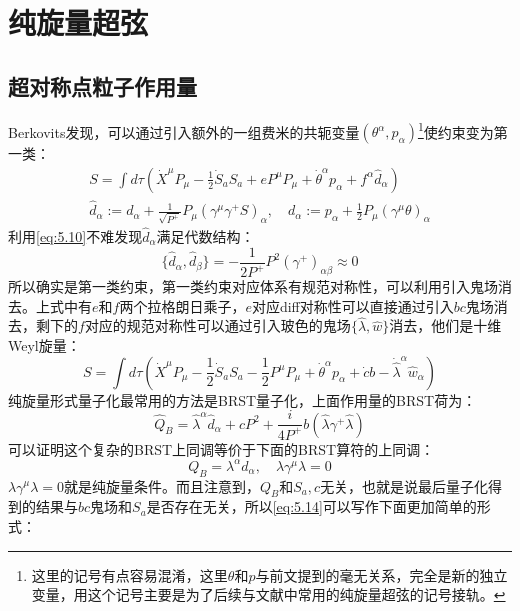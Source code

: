 \section{纯旋量超弦}
\subsection{超对称点粒子作用量}
Berkovits发现，可以通过引入额外的一组费米的共轭变量$(\theta^\alpha,p_\alpha)$\footnote{这里的记号有点容易混淆，这里$\theta$和$p$与前文提到的毫无关系，完全是新的独立变量，用这个记号主要是为了后续与文献中常用的纯旋量超弦的记号接轨。}使约束变为第一类：
\begin{equation}
\begin{gathered}
		S=\int d\tau\left(\dot{X}^\mu P_\mu-\frac{1}{2}\dot{S}_aS_a+eP^\mu P_\mu+\dot{\theta}^\alpha p_\alpha+f^\alpha\hat{d}_\alpha\right)\\
	\hat{d}_\alpha:=d_\alpha+\frac{1}{\sqrt{P^+}}P_\mu(\gamma^\mu\gamma^+S)_\alpha,\quad d_\alpha:=p_\alpha+\frac{1}{2}P_\mu(\gamma^\mu\theta)_\alpha
\end{gathered}
\end{equation}
利用\ref{eq:5.10}不难发现$\hat{d}_\alpha$满足代数结构：
\begin{equation}
	\{\hat{d}_\alpha,\hat{d}_\beta\}=-\frac{1}{2P^+}P^2(\gamma^+)_{\alpha\beta}\approx 0
\end{equation}
所以确实是第一类约束，第一类约束对应体系有规范对称性，可以利用引入鬼场消去。上式中有$e$和$f$两个拉格朗日乘子，$e$对应diff对称性可以直接通过引入$bc$鬼场消去，剩下的$f$对应的规范对称性可以通过引入玻色的鬼场$\{\hat\lambda,\hat w\}$消去，他们是十维Weyl旋量：
\begin{equation}
	\label{eq:5.14}
	S=\int d\tau\left(\dot{X}^\mu P_\mu-\frac{1}{2}\dot{S}_aS_a-\frac{1}{2}P^\mu P_\mu+\dot{\theta}^\alpha p_\alpha+\dot{c}b-\dot{\hat{\lambda}}^\alpha\hat{w}_\alpha\right)
\end{equation}
纯旋量形式量子化最常用的方法是BRST量子化，上面作用量的BRST荷为：\cite{Berkovits:2002zk,Berkovits:2001rb}
\begin{equation}
	\hat{Q}_B=\hat{\lambda}^\alpha\hat{d}_\alpha+cP^2+\frac{i}{4P^+}b(\hat{\lambda}\gamma^+\hat{\lambda})
\end{equation}
可以证明这个复杂的BRST上同调等价于下面的BRST算符的上同调：\cite{Berkovits:2002zk}
\begin{equation}
	\label{eq:5.16}
	Q_B=\lambda^\alpha d_\alpha, \quad \lambda\gamma^\mu\lambda = 0
\end{equation}
$\lambda\gamma^\mu\lambda = 0$就是纯旋量条件。而且注意到，$Q_B$和$S_a,c$无关，也就是说最后量子化得到的结果与$bc$鬼场和$S_a$是否存在无关，所以\ref{eq:5.14}可以写作下面更加简单的形式：
